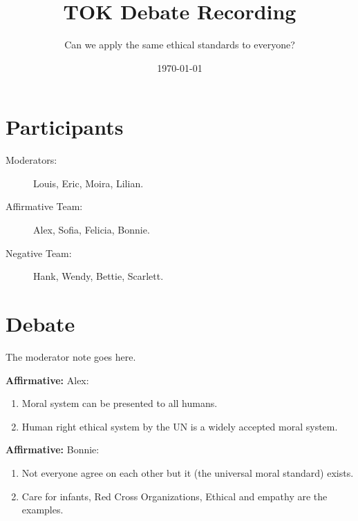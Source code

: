\documentclass[12pt]{article}
\newcommand{\moderator}[1]{{\color{modcolor}\textbf{Moderator:} #1}}
\newcommand{\affirmative}[1]{{\color{affirmcolor}\textbf{Affirmative:} #1}}
\newcommand{\timestamp}{{\color{gray}\scriptsize[\currenttime]}}
\begin{document}
\title{\Huge \textbf{TOK Debate Recording}}
\author{Can we apply the same ethical standards to everyone?}
\date{\today}
\maketitle

\section*{Participants}
\begin{description}
    \item[Moderators:] Louis, Eric, Moira, Lilian.
    \item[Affirmative Team:] Alex, Sofia, Felicia, Bonnie.
    \item[Negative Team:] Hank, Wendy, Bettie, Scarlett.
\end{description}



\section*{Debate}



\begin{tcolorbox}[title = Note]
    The moderator note goes here.
\end{tcolorbox}

\affirmative{Alex:
\begin{enumerate}
    \item Moral system can be presented to all humans. 
    \item Human right ethical system by the UN is a widely accepted moral system.
\end{enumerate}}

\affirmative{Bonnie:
\begin{enumerate}
    \item Not everyone agree on each other but it (the universal moral standard) exists.
    \item Care for infants, Red Cross Organizations, Ethical and empathy are the examples.
\end{enumerate}}
\end{document}

